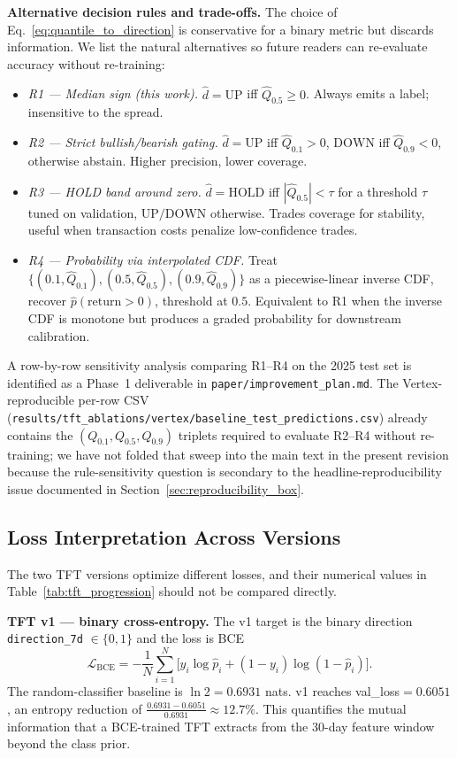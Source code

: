 \documentclass[conference]{IEEEtran}
\begin{document}
\textbf{Alternative decision rules and trade-offs.} The choice of Eq.~\eqref{eq:quantile_to_direction} is conservative for a binary metric but discards information. We list the natural alternatives so future readers can re-evaluate accuracy without re-training:
\begin{itemize}
\item \textit{R1 --- Median sign (this work).} $\hat{d} = \mathrm{UP}$ iff $\hat{Q}_{0.5} \geq 0$. Always emits a label; insensitive to the spread.
\item \textit{R2 --- Strict bullish/bearish gating.} $\hat{d} = \mathrm{UP}$ iff $\hat{Q}_{0.1} > 0$, $\mathrm{DOWN}$ iff $\hat{Q}_{0.9} < 0$, otherwise abstain. Higher precision, lower coverage.
\item \textit{R3 --- HOLD band around zero.} $\hat{d} = \mathrm{HOLD}$ iff $|\hat{Q}_{0.5}| < \tau$ for a threshold $\tau$ tuned on validation, $\mathrm{UP}/\mathrm{DOWN}$ otherwise. Trades coverage for stability, useful when transaction costs penalize low-confidence trades.
\item \textit{R4 --- Probability via interpolated CDF.} Treat $\{(0.1, \hat{Q}_{0.1}), (0.5, \hat{Q}_{0.5}), (0.9, \hat{Q}_{0.9})\}$ as a piecewise-linear inverse CDF, recover $\hat{p}(\text{return} > 0)$, threshold at $0.5$. Equivalent to R1 when the inverse CDF is monotone but produces a graded probability for downstream calibration.
\end{itemize}
A row-by-row sensitivity analysis comparing R1--R4 on the 2025 test set is identified as a Phase~1 deliverable in \texttt{paper/improvement\_plan.md}. The Vertex-reproducible per-row CSV (\texttt{results/tft\_ablations/vertex/baseline\_test\_predictions.csv}) already contains the $(Q_{0.1}, Q_{0.5}, Q_{0.9})$ triplets required to evaluate R2--R4 without re-training; we have not folded that sweep into the main text in the present revision because the rule-sensitivity question is secondary to the headline-reproducibility issue documented in Section~\ref{sec:reproducibility_box}.

\subsection{Loss Interpretation Across Versions}

The two TFT versions optimize different losses, and their numerical values in Table~\ref{tab:tft_progression} should not be compared directly.

\textbf{TFT v1 — binary cross-entropy.} The v1 target is the binary direction \texttt{direction\_7d} $\in \{0, 1\}$ and the loss is BCE
$$
\mathcal{L}_{\mathrm{BCE}} = -\frac{1}{N} \sum_{i=1}^{N} \bigl[y_i \log \hat{p}_i + (1-y_i)\log(1-\hat{p}_i)\bigr].
$$
The random-classifier baseline is $\ln 2 = 0.6931$ nats. v1 reaches val\_loss$=0.6051$, an entropy reduction of $\frac{0.6931 - 0.6051}{0.6931} \approx 12.7\%$. This quantifies the mutual information that a BCE-trained TFT extracts from the 30-day feature window beyond the class prior.
\end{document}
